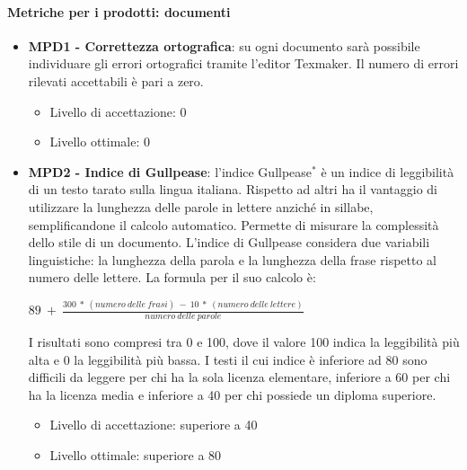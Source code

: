 	
	\paragraph{Metriche per i prodotti: documenti} 
	\begin{itemize}
		\item \textbf{MPD1 - Correttezza ortografica}: su ogni documento sarà possibile individuare gli errori ortografici tramite l'editor Texmaker. Il numero di errori rilevati accettabili è pari a zero.
		\begin{itemize}
	 \item Livello di accettazione: 0
	 \item Livello ottimale: 0
	 \end{itemize}
	 
		\item \textbf{MPD2 - Indice di Gullpease}: l'indice Gullpease$^*$ è un indice di leggibilità di un testo tarato sulla lingua italiana. Rispetto ad altri ha il vantaggio di utilizzare la lunghezza delle parole in lettere anziché in sillabe, semplificandone il calcolo automatico. Permette di misurare la complessità dello stile di un documento. L'indice di Gullpease considera due variabili linguistiche: la lunghezza della parola e la lunghezza della frase rispetto al numero delle lettere. La formula per il suo calcolo è:
	\begin{center}
		$89\ +\ \frac{300\ *\ (numero\ delle\ frasi)\ -\ 10\ *\ (numero\ delle\ lettere)}{numero\ delle\ parole}$
	\end{center}
	I risultati sono compresi tra 0 e 100, dove il valore 100 indica la leggibilità più alta e 0 la leggibilità più bassa. I testi il cui indice è inferiore ad 80 sono difficili da leggere per chi ha la sola licenza elementare, inferiore a 60 per chi ha la licenza media e inferiore a 40 per chi possiede un diploma superiore.
	\begin{itemize}
	 \item Livello di accettazione: superiore a 40
	 \item Livello ottimale: superiore a 80
	 \end{itemize}	
	\end{itemize}
	

